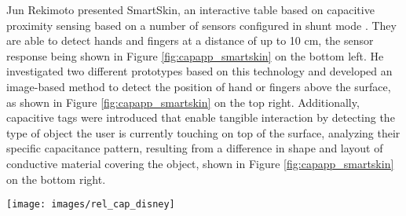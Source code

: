 Jun Rekimoto presented SmartSkin, an interactive table based on capacitive proximity sensing based on a number of sensors configured in shunt mode \cite{rekimoto2002smartskin}. They are able to detect hands and fingers at a distance of up to 10 cm, the sensor response being shown in Figure \ref{fig:capapp_smartskin} on the bottom left. He investigated two different prototypes based on this technology and developed an image-based method to detect the position of hand or fingers above the surface, as shown in Figure \ref{fig:capapp_smartskin} on the top right. Additionally, capacitive tags were introduced that enable tangible interaction by detecting the type of object the user is currently touching on top of the surface, analyzing their specific capacitance pattern, resulting from a difference in shape and layout of conductive material covering the object, shown in Figure \ref{fig:capapp_smartskin} on the bottom right.

\begin{minipage}{\linewidth}
\centering
\texttt{[image: images/rel\_cap\_disney]}
\label{fig:rel_cap_disney}
\end{minipage}

